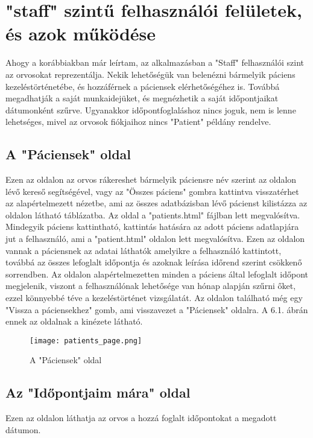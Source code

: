 \chapter{"staff" szintű felhasználói felületek, és azok működése}
\label{chap:fejezet6}

Ahogy a korábbiakban már leírtam, az alkalmazásban a "Staff" felhasználói szint az orvosokat reprezentálja. Nekik lehetőségük van belenézni bármelyik páciens kezeléstörténetébe, és hozzáférnek a páciensek elérhetőségéhez is. Továbbá megadhatják a saját munkaidejüket, és megnézhetik a saját időpontjaikat dátumonként szűrve. Ugyanakkor időpontfoglaláshoz nincs joguk, nem is lenne lehetséges, mivel az orvosok fiókjaihoz nincs "Patient" példány rendelve.

\section{A "Páciensek" oldal}

Ezen az oldalon az orvos rákereshet bármelyik páciensre név szerint az oldalon lévő kereső segítségével, vagy az "Összes páciens" gombra kattintva visszatérhet az alapértelmezett nézetbe, ami az összes adatbázisban lévő pácienst kilistázza az oldalon látható táblázatba. Az oldal a "patients.html" fájlban lett megvalósítva. Mindegyik páciens kattintható, kattintás hatására az adott páciens adatlapjára jut a felhasználó, ami a "patient.html" oldalon lett megvalósítva. Ezen az oldalon vannak a páciensnek az adatai láthatók amelyikre a felhasználó kattintott, továbbá az összes lefoglalt időpontja és azoknak leírása időrend szerint csökkenő sorrendben. Az oldalon alapértelmezetten minden a páciens által lefoglalt időpont megjelenik, viszont a felhasználónak lehetősége van hónap alapján szűrni őket, ezzel könnyebbé téve a kezeléstörténet vizsgálatát. Az oldalon található még egy "Vissza a páciensekhez" gomb, ami visszavezet a "Páciensek" oldalra. A 6.1. ábrán ennek az oldalnak a kinézete látható.

\begin{figure}[!htbp]
	\caption{A "Páciensek" oldal}
	\label{fig:paciensek}
	\centering
	\texttt{[image: patients\_page.png]}
\end{figure}

\section{Az "Időpontjaim mára" oldal}

Ezen az oldalon láthatja az orvos a hozzá foglalt időpontokat a megadott dátumon.

